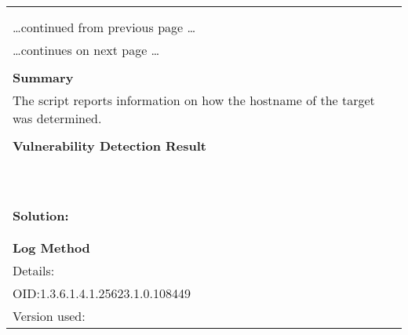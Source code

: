 \documentclass{article}
\begin{document}
\begin{longtable}{|p{}|}
\hline
\rowcolor{gvm_log}{\color{white}{Log (CVSS: 0.0) }}\\
\rowcolor{gvm_log}{\color{white}{NVT: Hostname Determination Reporting}}\\
\hline
\endfirsthead
\hfill\ldots continued from previous page \ldots \\
\hline
\endhead
\hline
\ldots continues on next page \ldots \\
\endfoot
\hline
\endlastfoot
\\
\textbf{Summary}\\
The script reports information on how the hostname
  of the target was determined.\\

        \hline
        \\
\textbf{Vulnerability Detection Result}\\
\rowcolor{white}{\verb=Hostname determination for IP 192.168.178.1:=}\\
\rowcolor{white}{\verb=Hostname|Source=}\\
\rowcolor{white}{\verb=breuelstrasse11|SSL/TLS server certificate=}\\
\rowcolor{white}{\verb=fritz.box|Reverse-DNS=}\\
\rowcolor{white}{\verb=fritz.nas|SSL/TLS server certificate=}\\
\rowcolor{white}{\verb=myfritz.box|SSL/TLS server certificate=}\\
\rowcolor{white}{\verb=www.fritz.box|SSL/TLS server certificate=}\\
\rowcolor{white}{\verb=www.fritz.nas|SSL/TLS server certificate=}\\
\rowcolor{white}{\verb=www.myfritz.box|SSL/TLS server certificate=}\\

          \hline
          \\
\textbf{Solution:}\\
\\


        \hline
        \\
\textbf{Log Method}\\
Details:
\rowcolor{white}{\verb=Hostname Determination Reporting=}\\
OID:1.3.6.1.4.1.25623.1.0.108449\\
Version used:
\rowcolor{white}{\verb=2018-11-19T11:11:31Z=}\\
\end{longtable}
\end{document}
